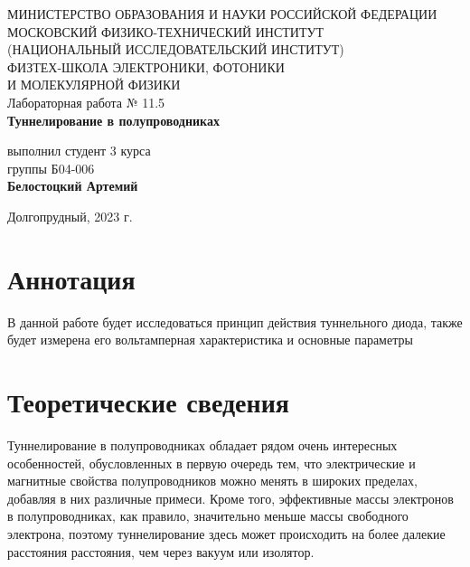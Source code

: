 \documentclass[a4paper,12pt]{article}
\begin{document}
 

\begin{titlepage}
	\begin{center}
		\large 	МИНИСТЕРСТВО ОБРАЗОВАНИЯ И НАУКИ РОССИЙСКОЙ ФЕДЕРАЦИИ\\
				МОСКОВСКИЙ ФИЗИКО-ТЕХНИЧЕСКИЙ ИНСТИТУТ \\
				(НАЦИОНАЛЬНЫЙ ИССЛЕДОВАТЕЛЬСКИЙ ИНСТИТУТ)\\ 
				ФИЗТЕХ-ШКОЛА ЭЛЕКТРОНИКИ, ФОТОНИКИ \\
				И МОЛЕКУЛЯРНОЙ ФИЗИКИ \\
		
		
		\vspace{4.0 cm}
		Лабораторная работа № 11.5\\
		\LARGE \textbf{Туннелирование в полупроводниках}
	\end{center}
	\vspace{3 cm} \large
	
	\begin{flushright}
		выполнил студент 3 курса \\
		{группы Б04-006}\\
		\textbf{Белостоцкий Артемий}\\
	\end{flushright}
	
	\vfill

	\begin{center}
	Долгопрудный, 2023 г.
	\end{center}
\end{titlepage}                                                                      

\section*{Аннотация}

В данной работе будет исследоваться принцип действия туннельного диода, также будет измерена его вольтамперная характеристика и основные параметры

\section*{Теоретические сведения}

Туннелирование в полупроводниках обладает рядом очень интересных особенностей, обусловленных в первую очередь тем, что электрические и магнитные свойства полупроводников можно менять в широких пределах, добавляя в них различные примеси. Кроме того, эффективные массы электронов в полупроводниках, как правило, значительно меньше массы свободного электрона, поэтому туннелирование здесь может происходить на более далекие расстояния расстояния, чем через вакуум или изолятор.
\end{document}
